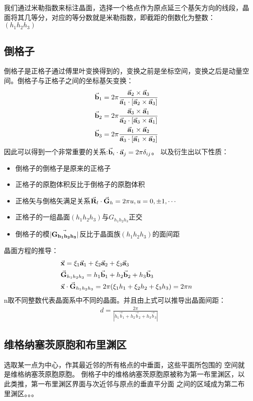 \documentclass[UTF8]{article}
\numberwithin{equation}{section}
\begin{document}
我们通过米勒指数来标注晶面，选择一个格点作为原点延三个基矢方向的线段，晶面将其几等分，对应的等分数就是米勒指数，即截距的倒数化为整数：
$(h_1h_2h_3)$

\subsection{倒格子}
倒格子是正格子通过傅里叶变换得到的，变换之前是坐标空间，变换之后是动量空间。倒格子与正格子之间的坐标基矢变换：
\begin{align*}
     & \va{b}_1=2\pi \frac{\va{a}_2\times \va{a}_3}{\va{a}_1\cdot [\va{a}_2\times\va{a}_3]} \\
     & \va{b}_2=2\pi \frac{\va{a}_3\times \va{a}_1}{\va{a}_2\cdot [\va{a}_3\times\va{a}_1]} \\
     & \va{b}_3=2\pi \frac{\va{a}_1\times \va{a}_2}{\va{a}_3\cdot [\va{a}_1\times\va{a}_2]}
\end{align*}
因此可以得到一个非常重要的关系:$\va{b}_i\cdot \va{a}_j=2\pi \delta_{ij}$。
以及衍生出以下性质：
\begin{itemize}
    \item 倒格子的倒格子是原来的正格子
    \item 正格子的原胞体积反比于倒格子的原胞体积
    \item 正格矢与倒格矢满足关系$\va{R}_l\cdot\va{G}_h=2\pi u,u=0,\pm 1,\cdots$
    \item 正格子的一组晶面$(h_1h_2h_3)$与$G_{h_1h_2h_3}$正交
    \item 倒格子的模$|\va{G_{h_1h_2h_3}}|$反比于晶面族$(h_1h_2h_3)$的面间距
\end{itemize}
晶面方程的推导：
\begin{align*}
     & \va{x}=\xi_1\va{a}_1+\xi_2\va{a}_2+\xi_3\va{a}_3                \\
     & \va{G}_{h_1h_2h_3}=h_1\va{b}_1+h_2\va{b}_2+h_3\va{b}_3          \\
     & \va{x}\cdot\va{G}_{h_1h_2h_3}=2\pi (\xi_1h_1+\xi_2h_2+\xi_3h_3)
    =2\pi n
\end{align*}
n取不同整数代表晶面系中不同的晶面。并且由上式可以推导出晶面间距：
\begin{align*}
     & d = \frac{2\pi}{|h_1\vec{b}_1+h_2\vec{b}_2+h_3\vec{b}_3|}
\end{align*}
\subsection{维格纳塞茨原胞和布里渊区}
选取某一点为中心，作其最近邻的所有格点的中垂面，这些平面所包围的
空间就是维格纳塞茨原胞原胞。
倒格子中的维格纳塞茨原胞原被称为第一布里渊区，以此类推，第一布里渊区界面与次近邻与原点的垂直平分面
之间的区域成为第二布里渊区。。。
\end{document}
